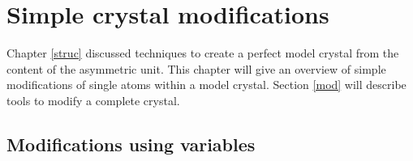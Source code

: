 
\chapter{Simple crystal modifications \label{mod-simple}}

Chapter \ref{struc} discussed techniques to create a 
perfect model crystal from the content of the asymmetric unit.
This chapter will give an overview of simple modifications of single
atoms within a model crystal.  Section \ref{mod} will describe
\Discus tools to modify a complete crystal.


\section{Modifications using variables \label{mod-var}}

